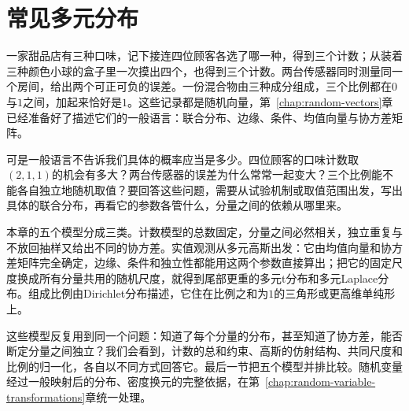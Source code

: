 \chapter{常见多元分布}
\label{chap:multivariate-distributions}

一家甜品店有三种口味，记下接连四位顾客各选了哪一种，得到三个计数；从装着三种颜色小球的盒子里一次摸出四个，也得到三个计数。两台传感器同时测量同一个房间，给出两个可正可负的误差。一份混合物由三种成分组成，三个比例都在$0$与$1$之间，加起来恰好是$1$。这些记录都是随机向量，第~\ref{chap:random-vectors}章已经准备好了描述它们的一般语言：联合分布、边缘、条件、均值向量与协方差矩阵。

可是一般语言不告诉我们具体的概率应当是多少。四位顾客的口味计数取$(2,1,1)$的机会有多大？两台传感器的误差为什么常常一起变大？三个比例能不能各自独立地随机取值？要回答这些问题，需要从试验机制或取值范围出发，写出具体的联合分布，再看它的参数各管什么，分量之间的依赖从哪里来。

本章的五个模型分成三类。计数模型的总数固定，分量之间必然相关，独立重复与不放回抽样又给出不同的协方差。实值观测从多元高斯出发：它由均值向量和协方差矩阵完全确定，边缘、条件和独立性都能用这两个参数直接算出；把它的固定尺度换成所有分量共用的随机尺度，就得到尾部更重的多元t分布和多元Laplace分布。组成比例由Dirichlet分布描述，它住在比例之和为$1$的三角形或更高维单纯形上。

这些模型反复用到同一个问题：知道了每个分量的分布，甚至知道了协方差，能否断定分量之间独立？我们会看到，计数的总和约束、高斯的仿射结构、共同尺度和比例的归一化，各自以不同方式回答它。最后一节把五个模型并排比较。随机变量经过一般映射后的分布、密度换元的完整依据，在第~\ref{chap:random-variable-transformations}章统一处理。














